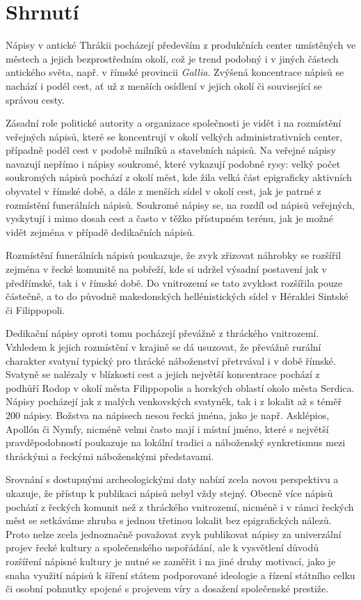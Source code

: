 
\section[shrnutí-25]{Shrnutí}

Nápisy v antické Thrákii pocházejí především z produkčních center umístěných ve městech a jejich bezprostředním okolí, což je trend podobný i v jiných částech antického světa, např. v římské provincii {\em Gallia}. Zvýšená koncentrace nápisů se nachází i podél cest, ať už z menších osídlení v jejich okolí či související se správou cesty.

Zásadní role politické autority a organizace společnosti je vidět i na rozmístění veřejných nápisů, které se koncentrují v okolí velkých administrativních center, případně podél cest v podobě milníků a stavebních nápisů. Na veřejné nápisy navazují nepřímo i nápisy soukromé, které vykazují podobné rysy: velký počet soukromých nápisů pochází z okolí měst, kde žila velká část epigraficky aktivních obyvatel v římské době, a dále z menších sídel v okolí cest, jak je patrné z rozmístění funerálních nápisů. Soukromé nápisy se, na rozdíl od nápisů veřejných, vyskytují i mimo dosah cest a často v těžko přístupném terénu, jak je možné vidět zejména v případě dedikačních nápisů.

Rozmístění funerálních nápisů poukazuje, že zvyk zřizovat náhrobky se rozšířil zejména v řecké komunitě na pobřeží, kde si udržel výsadní postavení jak v předřímské, tak i v římské době. Do vnitrozemí se tato zvyklost rozšířila pouze částečně, a to do původně makedonských hellénistických sídel v Héraklei Sintské či Filippopoli.

Dedikační nápisy oproti tomu pocházejí převážně z thráckého vnitrozemí. Vzhledem k jejich rozmístění v krajině se dá usuzovat, že převážně rurální charakter svatyní typický pro thrácké náboženství přetrvával i v době římské. Svatyně se nalézaly v blízkosti cest a jejich největší koncentrace pochází z podhůří Rodop v okolí města Filippopolis a horských oblastí okolo města Serdica. Nápisy pocházejí jak z malých venkovských svatyněk, tak i z lokalit až s téměř 200 nápisy. Božstva na nápisech nesou řecká jména, jako je např. Asklépios, Apollón či Nymfy, nicméně velmi často mají i místní jméno, které s největší pravděpodobností poukazuje na lokální tradici a náboženský synkretismus mezi thráckými a řeckými náboženskými představami.

Srovnání s dostupnými archeologickými daty nabízí zcela novou perspektivu a ukazuje, že přístup k publikaci nápisů nebyl vždy stejný. Obecně více nápisů pochází z řeckých komunit než z thráckého vnitrozemí, nicméně i v rámci řeckých měst se setkáváme zhruba s jednou třetinou lokalit bez epigrafických nálezů. Proto nelze zcela jednoznačně považovat zvyk publikovat nápisy za univerzální projev řecké kultury a společenského uspořádání, ale k vysvětlení důvodů rozšíření nápisné kultury je nutné se zaměřit i na jiné druhy motivací, jako je snaha využití nápisů k šíření státem podporované ideologie a řízení státního celku či osobní pohnutky spojené s projevem víry a dosažení společenské prestiže.

